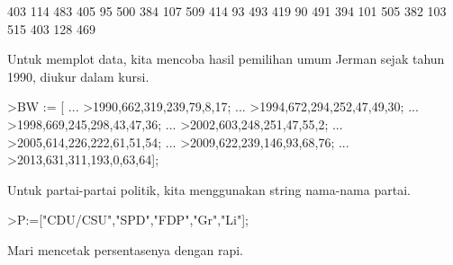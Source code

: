 \documentclass[a4paper,10pt]{article}
\begin{document}
\begin{eulernotebook}
\begin{euleroutput}
            403           114           483 
            405            95           500 
            384           107           509 
            414            93           493 
            419            90           491 
            394           101           505 
            382           103           515 
            403           128           469 
\end{euleroutput}
\begin{eulercomment}
Untuk memplot data, kita mencoba hasil pemilihan umum Jerman sejak
tahun 1990, diukur dalam kursi.
\end{eulercomment}
\begin{eulerprompt}
>BW := [ ...
>1990,662,319,239,79,8,17; ...
>1994,672,294,252,47,49,30; ...
>1998,669,245,298,43,47,36; ...
>2002,603,248,251,47,55,2; ...
>2005,614,226,222,61,51,54; ...
>2009,622,239,146,93,68,76; ...
>2013,631,311,193,0,63,64];
\end{eulerprompt}
\begin{eulercomment}
Untuk partai-partai politik, kita menggunakan string nama-nama partai.
\end{eulercomment}
\begin{eulerprompt}
>P:=["CDU/CSU","SPD","FDP","Gr","Li"];
\end{eulerprompt}
\begin{eulercomment}
Mari mencetak persentasenya dengan rapi.


\end{eulercomment}
\end{eulernotebook}
\end{document}
